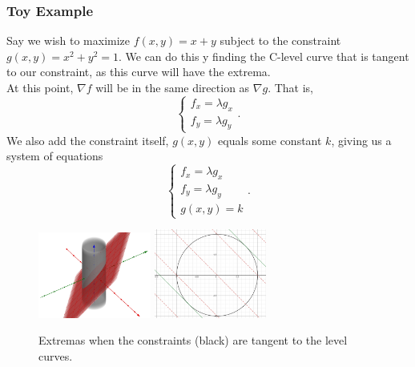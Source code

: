 \subsubsection{Toy Example}
\noindent
Say we wish to maximize $f(x,y) = x+y$ subject to the constraint $g(x,y) = x^2 + y^2 = 1$.
We can do this y finding the C-level curve that is tangent to our constraint, as this curve will have the extrema.\\
At this point, $\nabla f$ will be in the same direction as $\nabla g$.
That is,
\begin{equation*}
	\begin{cases} 
		f_x = \lambda g_x \\ 
		f_y = \lambda g_y
	\end{cases}.
\end{equation*}
We also add the constraint itself, $g(x,y)$ equals some constant $k$, giving us a system of equations
\begin{equation*}
	\begin{cases}
		f_x = \lambda g_x \\ 
		f_y = \lambda g_y \\ 
		g(x,y)=k 
	\end{cases}.
\end{equation*}

\begin{figure}[H]
	\centering
	\includegraphics[width=0.33\textwidth]{./Images/differentialMultivariableCalculus/lagrange_slice.png}
	\includegraphics[width=0.33\textwidth]{./Images/differentialMultivariableCalculus/lagrange_curves.png}
	\caption{Extremas when the constraints (black) are tangent to the level curves.}
\end{figure}
